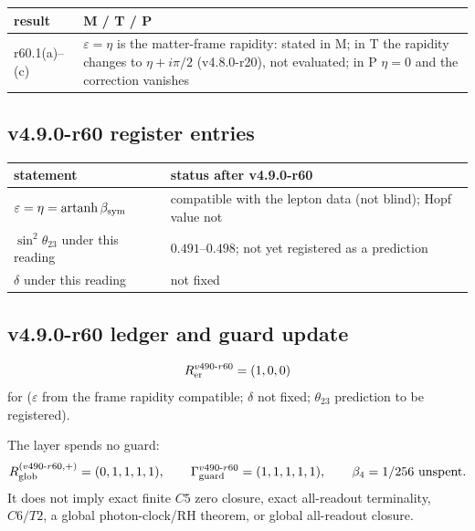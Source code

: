 \begin{center}
\small
\begin{tabular}{@{}>{\raggedright\arraybackslash}p{}>{\raggedright\arraybackslash}p{}@{}}
\toprule
result & M / T / P\\
\midrule
r60.1(a)--(c) & \(\varepsilon=\eta\) is the matter-frame rapidity: stated in M; in T the rapidity changes to \(\eta+i\pi/2\) (v4.8.0-r20), not evaluated; in P \(\eta=0\) and the correction vanishes\\
\bottomrule
\end{tabular}
\end{center}

\subsection*{v4.9.0-r60 register entries}
\label{subsec:v490-r60-register}

\begin{center}
\small
\begin{tabular}{@{}>{\raggedright\arraybackslash}p{}>{\raggedright\arraybackslash}p{}@{}}
\toprule
statement & status after v4.9.0-r60\\
\midrule
\(\varepsilon=\eta=\operatorname{artanh}\beta_{\rm sym}\) & compatible with the lepton data (not blind); Hopf value not\\
\(\sin^2\theta_{23}\) under this reading & \(0.491\)--\(0.498\); not yet registered as a prediction\\
\(\delta\) under this reading & not fixed\\
\bottomrule
\end{tabular}
\end{center}

\subsection*{v4.9.0-r60 ledger and guard update}
\label{subsec:v490-r60-ledger-guard}

\[
R_{\rm er}^{v490\text{-}r60}=(1,0,0)
\]
for (\(\varepsilon\) from the frame rapidity compatible; \(\delta\) not fixed; \(\theta_{23}\) prediction to be registered).

The layer spends no guard:
\[
R_{\rm glob}^{(v490\text{-}r60,+)}=(0,1,1,1,1),
\qquad
\Gamma_{\rm guard}^{v490\text{-}r60}=(1,1,1,1,1),
\qquad
\beta_4=1/256\ \text{unspent}.
\]
It does not imply exact finite \(C5\) zero closure, exact all-readout terminality,
\(C6/T2\), a global photon-clock/RH theorem, or global all-readout closure.
